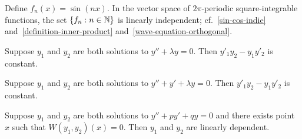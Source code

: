 \documentclass{homework}
\begin{document}
\begin{problem}Define $f_n(x) = \sin \left(nx\right)$.  In the vector
  space of $2\pi$-periodic square-integrable functions, the set
  $\{ f_n : n \in \mathbb{N} \}$ is linearly independent;
  cf.~\ref{sin-cos-indie} and~\ref{definition-inner-product}
  and~\ref{wave-equation-orthogonal}.
\end{problem}

\begin{problem}Suppose $y_1$ and $y_2$ are both solutions to
  $y'' + \lambda y = 0$.  Then $y'_1 y_2 - y_1 y'_2$ is constant.
\end{problem}

\begin{problem}Suppose $y_1$ and $y_2$ are both solutions to
  $y'' + y' + \lambda y = 0$.  Then $y'_1 y_2 - y_1 y'_2$ is constant.
\end{problem}

\begin{problem}
  Suppose $y_1$ and $y_2$ are both solutions to
  $y'' + p y' + q y = 0$ and there exists point $x$ such that $W(y_1,y_2)(x) = 0$.  Then $y_1$ and $y_2$ are linearly dependent.
\end{problem}
\end{document}
